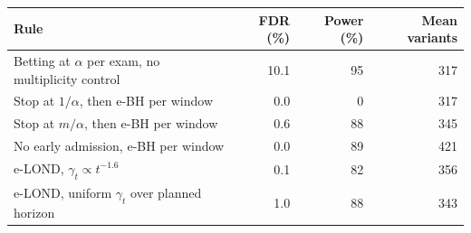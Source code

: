 \begin{tabular}{lrrr}
\toprule
Rule & FDR (\%) & Power (\%) & Mean variants \\
\midrule
Betting at $\alpha$ per exam, no multiplicity control & 10.1 & 95 & 317 \\
Stop at $1/\alpha$, then e-BH per window & 0.0 & 0 & 317 \\
Stop at $m/\alpha$, then e-BH per window & 0.6 & 88 & 345 \\
No early admission, e-BH per window & 0.0 & 89 & 421 \\
e-LOND, $\gamma_t\propto t^{-1.6}$ & 0.1 & 82 & 356 \\
e-LOND, uniform $\gamma_t$ over planned horizon & 1.0 & 88 & 343 \\
\bottomrule
\end{tabular}
